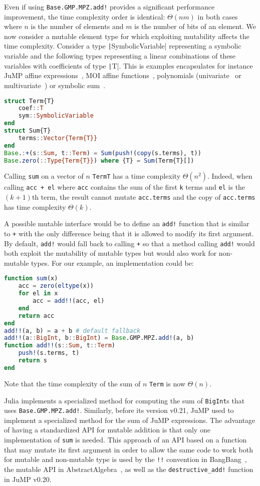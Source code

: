 \documentclass{juliacon}
\begin{document}
Even if using \lstinline|Base.GMP.MPZ.add!| provides a significant performance improvement,
the time complexity order is identical: $\Theta(nm)$ in both cases where $n$ is the number of elements and $m$ is the number of bits of an element.
We now consider a mutable element type for which exploiting mutability affects the time complexity.
Consider a type \texttt|SymbolicVariable| representing a symbolic variable and the following types representing a linear combinations of these variables with coefficients of type \texttt|T|.
This is examples encapsulates for instance JuMP affine expressions~\cite{dunning2017jump}, MOI affine functions~\cite{legat2021mathoptinterface}, polynomials (univariate~\cite{verzani2021polynomials} or multivariate~\cite{legat2021multivariatepolynomials}) or symbolic sum~\cite{gowda2021high}.
\begin{lstlisting}[language = Julia]
struct Term{T}
    coef::T
    sym::SymbolicVariable
end
struct Sum{T}
    terms::Vector{Term{T}}
end
Base.:+(s::Sum, t::Term) = Sum(push!(copy(s.terms), t))
Base.zero(::Type{Term{T}}) where {T} = Sum(Term{T}[])
\end{lstlisting}
Calling \texttt{sum} on a vector of $n$ \texttt{Term{T}} has a time complexity $\Theta(n^2)$.
Indeed, when calling \lstinline|acc + el| where \lstinline|acc| contains the sum of the first \lstinline|k| terms and \lstinline|el| is the $(k+1)$th term,
the result cannot mutate \lstinline|acc.terms| and the copy of \lstinline|acc.terms| has time complexity $\Theta(k)$.

A possible mutable interface would be to define an \lstinline|add!| function
that is similar to \lstinline|+| with the only difference being that it
is allowed to modify its first argument.
By default, \lstinline|add!| would fall back to calling \lstinline|+|
so that a method calling \lstinline|add!| would both exploit the mutability
of mutable types but would also work for non-mutable types.
For our example, an implementation could be:
\begin{lstlisting}[language = Julia]
function sum(x)
    acc = zero(eltype(x))
    for el in x
        acc = add!!(acc, el)
    end
    return acc
end
add!!(a, b) = a + b # default fallback
add!!(a::BigInt, b::BigInt) = Base.GMP.MPZ.add!(a, b)
function add!!(s::Sum, t::Term)
    push!(s.terms, t)
    return s
end
\end{lstlisting}
Note that the time complexity of the sum of $n$ \lstinline|Term| is now $\Theta(n)$.

Julia implements a specialized method for computing the sum of \lstinline|BigInt|s that uses \lstinline|Base.GMP.MPZ.add!|.
Similarly, before its version v0.21, JuMP used to implement a specialized method for the sum of JuMP expressions.
The advantage of having a standardized API for mutable addition is that
only one implementation of \lstinline|sum| is needed.
This approach of an API based on a function that may mutate its first argument in order to allow the same code to work both for mutable and non-mutable type is
used by the \lstinline|!!| convention in BangBang~\cite{takafumi2021bangbang},
the mutable API in AbstractAlgebra~\cite{AbstractAlgebra.jl-2017},
as well as the \lstinline|destructive_add!| function in JuMP v0.20.
\end{document}
